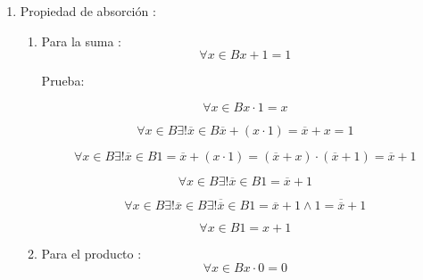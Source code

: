 \begin{enumerate}
\begin{enumerate}
\begin{enumerate}
\begin{enumerate}
        \[x{: = 0}{\overline{x} = 1}{{{0 =} = {1 \cdot e}} = e}\]

        \[{\forall{u \in B}\left( {\forall{x \in B}{{x + e} = x}} \right)}\Rightarrow\left( {e = 0} \right)\]
      \item
        Solo hay un \[1\]o elemento neutro del
        producto:\[\forall{u \in B}{{({\forall{x \in B}{{x \cdot u} = x}})}\Rightarrow{({u = 1})}}\]

        Prueba:

        \[\forall{x \in B}{x \cdot u}{=}x\]

        \[\forall{x \in B}\exists{\overline{x} \in B}{{{\overline{x} + {({x \cdot u})}} = {\overline{x} + x}} = 1}\]

        \[\forall{x \in B}\exists{\overline{x} \in B}1{{{{= {\overline{x} + {({x \cdot u})}}} = {\overline{x} + x}} = {\overline{x} + u}} = {\overline{x} + u}}\]

        \[x{: = 1}{\overline{x} = 0}{{{1 =} = {0 + u}} = u}\]

        \[{\forall{u \in B}\left( {\forall{x \in B}{{x \cdot u} = x}} \right)}\Rightarrow\left( {u = 1} \right)\]
      \end{enumerate}
    \item
      Propiedad de absorción :

      \begin{enumerate}
      \def\labelenumiv{\arabic{enumiv}.}
      \item
        Para la suma : \[\forall{x \in B}{{x + 1} = 1}\]

        Prueba:

        \[\forall{x \in B}{x \cdot 1}{=}x\]

        \[\forall{x \in B}{\exists\mathtt{\mathrm{!}}}{\overline{x} \in B}{{{\overline{x} + {({x \cdot 1})}} = {\overline{x} + x}} = 1}\]

        \[\forall{x \in B}{\exists\mathtt{\mathrm{!}}}{\overline{x} \in B}{{{1 = {\overline{x} + {({x \cdot 1})}}} = {{({\overline{x} + x})} \cdot {({\overline{x} + 1})}}} = {\overline{x} + 1}}\]

        \[\forall{x \in B}{\exists\mathtt{\mathrm{!}}}{\overline{x} \in B}{1 = {\overline{x} + 1}}\]

        \[\forall{x \in B}{\exists\mathtt{\mathrm{!}}}{\overline{x} \in B}{\exists\mathtt{\mathrm{!}}}{\overline{\overline{x}} \in B}{1 = {\overline{x} + 1}} \land {1 = {\overline{\overline{x}} + 1}}\]

        \[\forall{x \in B}{1 = {x + 1}}\]
      \item
        Para el producto : \[\forall{x \in B}{{x \cdot 0} = 0}\]


\end{enumerate}
\end{enumerate}
\end{enumerate}
\end{enumerate}
